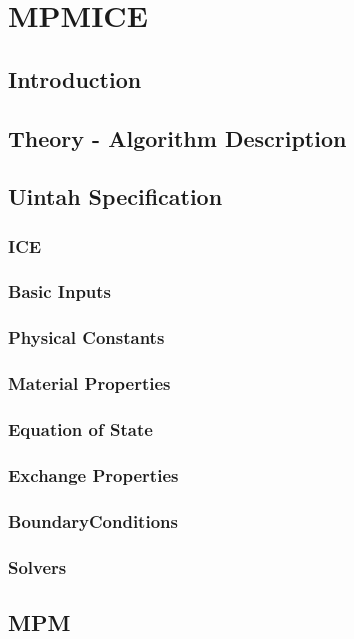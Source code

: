 
\section{MPMICE}

\subsection{Introduction}

\subsection{Theory - Algorithm Description}

\subsection{Uintah Specification}

\subsubsection{ICE}

\subsubsection{Basic Inputs}
\subsubsection{Physical Constants}
\subsubsection{Material Properties}
\subsubsection{Equation of State}
\subsubsection{Exchange Properties}
\subsubsection{BoundaryConditions}
\subsubsection{Solvers}


\subsection{MPM}

